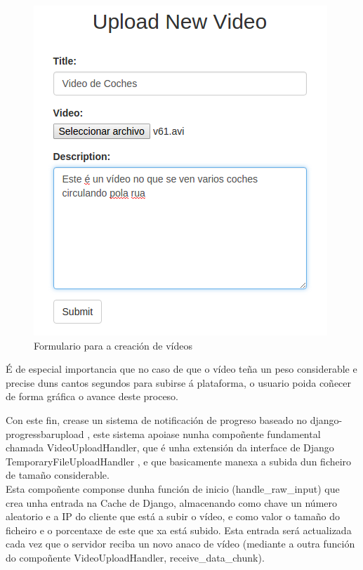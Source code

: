         \begin{figure}[htp]
        \begin{center}
            \includegraphics[scale=0.6]{figures/SubidaVideoForm.png}
            \caption{Formulario para a creación de vídeos}
        \label{fig:SubidaVideoForm}
        \end{center}
        \end{figure}    
        
        É de especial importancia que no caso de que o vídeo teña un peso considerable e precise 
        duns cantos segundos para subirse á plataforma, o usuario poida coñecer de forma gráfica
        o avance deste proceso.
        
        Con este fin, crease un sistema de notificación de progreso baseado no 
        django-progressbarupload \cite{django-progressbarupload}, este sistema apoiase nunha compoñente
        fundamental chamada VideoUploadHandler, que é unha extensión da interface de Django 
        TemporaryFileUploadHandler \cite{TemporaryFileUploadHandler}, e que basicamente manexa a subida
        dun ficheiro de tamaño considerable.\\
        
        Esta compoñente componse dunha función de inicio (handle\_raw\_input) que crea unha entrada 
        na Cache de Django, almacenando como chave un número aleatorio e a IP do cliente que está a
        subir o vídeo, e como valor o tamaño do ficheiro e o porcentaxe de este que xa está subido.
        Esta entrada será actualizada cada vez que o servidor reciba un novo anaco de vídeo (mediante
        a outra función do compoñente VideoUploadHandler, receive\_data\_chunk). 
        
